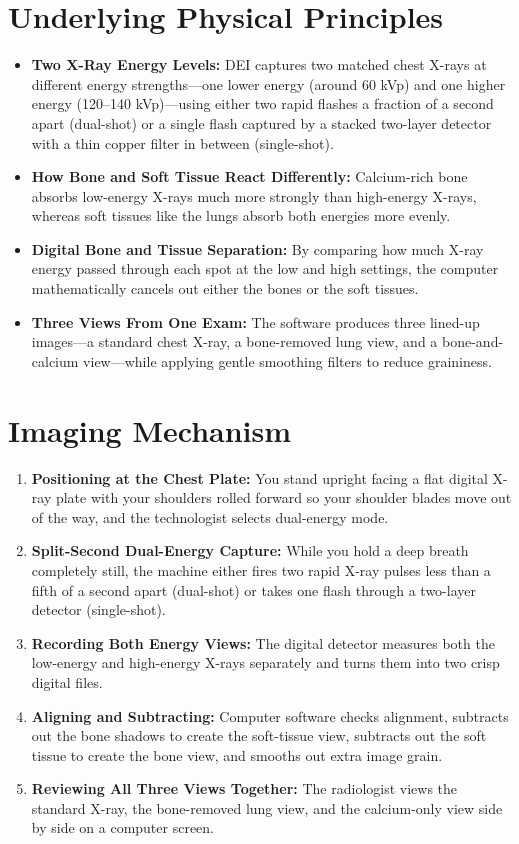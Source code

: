 \section{Underlying Physical Principles}
\begin{itemize}
    \item \textbf{Two X-Ray Energy Levels:} DEI captures two matched chest X-rays at different energy strengths---one lower energy (around 60 kVp) and one higher energy (120--140 kVp)---using either two rapid flashes a fraction of a second apart (dual-shot) or a single flash captured by a stacked two-layer detector with a thin copper filter in between (single-shot).
    \item \textbf{How Bone and Soft Tissue React Differently:} Calcium-rich bone absorbs low-energy X-rays much more strongly than high-energy X-rays, whereas soft tissues like the lungs absorb both energies more evenly.
    \item \textbf{Digital Bone and Tissue Separation:} By comparing how much X-ray energy passed through each spot at the low and high settings, the computer mathematically cancels out either the bones or the soft tissues.
    \item \textbf{Three Views From One Exam:} The software produces three lined-up images---a standard chest X-ray, a bone-removed lung view, and a bone-and-calcium view---while applying gentle smoothing filters to reduce graininess.
\end{itemize}

\section{Imaging Mechanism}
\begin{enumerate}
    \item \textbf{Positioning at the Chest Plate:} You stand upright facing a flat digital X-ray plate with your shoulders rolled forward so your shoulder blades move out of the way, and the technologist selects dual-energy mode.
    \item \textbf{Split-Second Dual-Energy Capture:} While you hold a deep breath completely still, the machine either fires two rapid X-ray pulses less than a fifth of a second apart (dual-shot) or takes one flash through a two-layer detector (single-shot).
    \item \textbf{Recording Both Energy Views:} The digital detector measures both the low-energy and high-energy X-rays separately and turns them into two crisp digital files.
    \item \textbf{Aligning and Subtracting:} Computer software checks alignment, subtracts out the bone shadows to create the soft-tissue view, subtracts out the soft tissue to create the bone view, and smooths out extra image grain.
    \item \textbf{Reviewing All Three Views Together:} The radiologist views the standard X-ray, the bone-removed lung view, and the calcium-only view side by side on a computer screen.
\end{enumerate}

